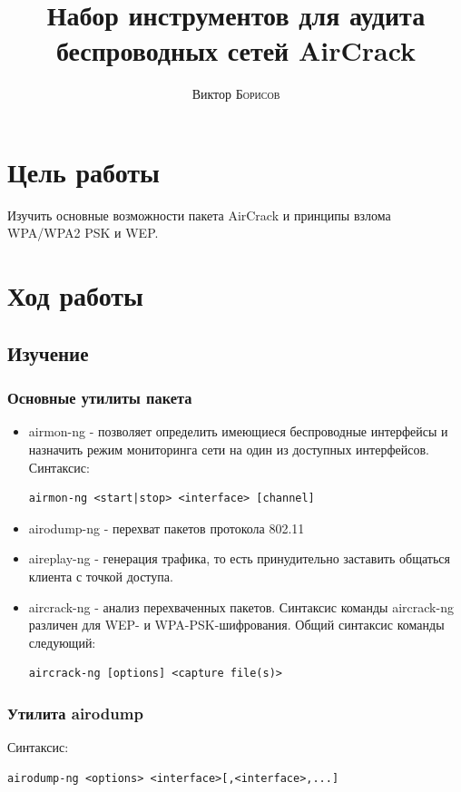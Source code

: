 \documentclass[10pt,a4paper]{article}
\title{Набор инструментов для аудита беспроводных сетей AirCrack} %
\author{Виктор \textsc{Борисов}} %
\begin{document}
\maketitle %

\newpage

\tableofcontents

\newpage


\section{Цель работы}
Изучить основные возможности пакета AirCrack и принципы взлома WPA/WPA2 PSK и WEP.


\section{Ход работы}

\subsection{Изучение}
\subsubsection{Основные утилиты пакета}
\begin{itemize}
\item airmon-ng - позволяет определить имеющиеся беспроводные интерфейсы и назначить режим мониторинга сети на один из доступных интерфейсов. Синтаксис:
\begin{verbatim}
airmon-ng <start|stop> <interface> [channel]
\end{verbatim}
\item airodump-ng - перехват пакетов протокола 802.11
\item aireplay-ng - генерация трафика, то есть принудительно заставить общаться клиента с точкой доступа.
\item aircrack-ng - анализ перехваченных пакетов. Синтаксис команды aircrack-ng различен для WEP- и WPA-PSK-шифрования. Общий синтаксис команды следующий:
\begin{verbatim}
aircrack-ng [options] <capture file(s)>
\end{verbatim}
\end{itemize}

\subsubsection{Утилита airodump}
Синтаксис:
\begin{verbatim}
airodump-ng <options> <interface>[,<interface>,...]
\end{verbatim}
\end{document}
